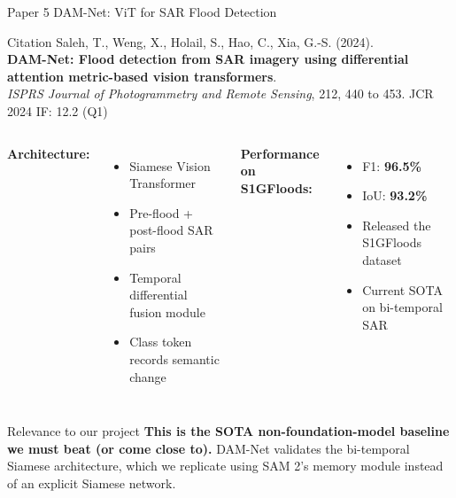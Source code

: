 \documentclass[10pt,aspectratio=169]{beamer}
\begin{document}
\begin{frame}{Paper 5 \quad DAM-Net: ViT for SAR Flood Detection}
\begin{block}{Citation}
Saleh, T., Weng, X., Holail, S., Hao, C., Xia, G.-S. (2024). \\
\textbf{DAM-Net: Flood detection from SAR imagery using differential attention metric-based vision transformers}. \\
\textit{ISPRS Journal of Photogrammetry and Remote Sensing}, 212, 440 to 453. \quad \textcolor{primaryblue}{JCR 2024 IF: 12.2 (Q1)}
\end{block}

\begin{columns}[T,onlytextwidth]
\textbf{Architecture:}
\begin{itemize}
\item Siamese Vision Transformer
\item Pre-flood + post-flood SAR pairs
\item Temporal differential fusion module
\item Class token records semantic change
\end{itemize}

\textbf{Performance on S1GFloods:}
\begin{itemize}
\item F1: \textbf{96.5\%}
\item IoU: \textbf{93.2\%}
\item Released the S1GFloods dataset
\item Current SOTA on bi-temporal SAR
\end{itemize}
\end{columns}

\vspace{0.5em}
\begin{alertblock}{Relevance to our project}
\textbf{This is the SOTA non-foundation-model baseline we must beat (or come close to).} DAM-Net validates the bi-temporal Siamese architecture, which we replicate using SAM 2's memory module instead of an explicit Siamese network.
\end{alertblock}
\end{frame}
\end{document}
